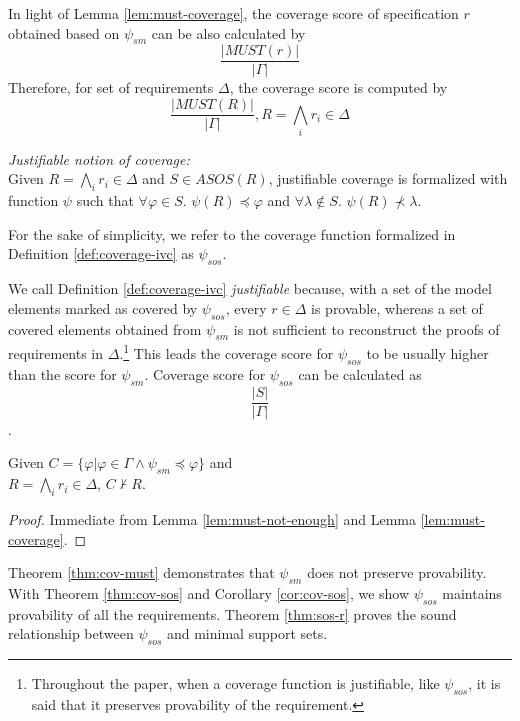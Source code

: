 In light of Lemma \ref{lem:must-coverage}, the coverage score of specification $r$ obtained based on $\psi_{sm}$ can be also calculated by
$$\frac{|MUST(r)|}{|\Gamma|}$$
Therefore, for set of requirements $\Delta$, the coverage score is computed by $$\frac{|MUST(R)|}{|\Gamma|},\xspace  R = \bigwedge_{i} {r_i \in \Delta}$$

\begin{definition} {\emph{Justifiable notion of coverage:}} \\
  \label{def:coverage-ivc}
  Given $R = \bigwedge_{i} {r_i \in \Delta}$ and $S \in ASOS(R)$, justifiable coverage is formalized with function $\psi$ such that  $\forall \varphi \in S$. $\psi (R) \preccurlyeq \varphi$
  and $\forall \lambda \notin S$. $\psi (R) \nprec \lambda$.
\end{definition}
\vspace{2mm}

For the sake of simplicity, we refer to the coverage function
formalized in Definition \ref{def:coverage-ivc} as $\psi_{sos}$.

We call Definition \ref{def:coverage-ivc} \emph{justifiable} because, with a set of the model elements marked as covered by $\psi_{sos}$, every $r \in \Delta$ is provable, whereas a set of covered elements obtained from $\psi_{sm}$ is not sufficient to reconstruct the proofs of requirements in $\Delta$.\footnote{Throughout the paper, when a coverage function is justifiable, like $\psi_{sos}$, it is said that it preserves provability of the requirement.}
This leads the coverage score for $\psi_{sos}$ to be usually higher than the score for $\psi_{sm}$. Coverage score for $\psi_{sos}$ can be calculated as $$\frac{|S|}{|\Gamma|}$$.

\begin{theorem}
\label{thm:cov-must}
Given $C = \{\varphi | \varphi \in \Gamma \wedge \psi_{sm} \preccurlyeq \varphi \}$
and \\ $R = \bigwedge_{i} {r_i \in \Delta}$, $C \nvdash R$.
\end{theorem}
\begin{proof}
Immediate from Lemma \ref{lem:must-not-enough} and Lemma \ref{lem:must-coverage}.
\end{proof}
\vspace{2mm}
Theorem \ref{thm:cov-must} demonstrates that $\psi_{sm}$ does not preserve provability. 
With Theorem \ref{thm:cov-sos} and Corollary \ref{cor:cov-sos}, 
we show $\psi_{sos}$ maintains provability of all the requirements. 
Theorem \ref{thm:sos-r} proves the sound relationship 
between $\psi_{sos}$ and minimal support sets.


